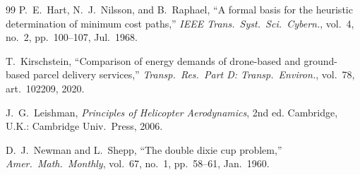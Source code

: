 \documentclass[conference]{IEEEtran}
\newcommand{\rd}[1]{#1}   %
\begin{document}
\begin{thebibliography}{99}
P.\ E.\ Hart, N.\ J.\ Nilsson, and B.\ Raphael, ``A formal basis for the heuristic
determination of minimum cost paths,'' \emph{IEEE Trans.\ Syst.\ Sci.\ Cybern.},
vol.~4, no.~2, pp.~100--107, Jul.\ 1968.

T.\ Kirschstein, ``Comparison of energy demands of drone-based and
ground-based parcel delivery services,'' \emph{Transp.\ Res.\ Part D: Transp.\
Environ.}, vol.~78, art.~102209, 2020.

\rd{J.\ G.\ Leishman, \emph{Principles of Helicopter Aerodynamics}, 2nd ed.
Cambridge, U.K.: Cambridge Univ.\ Press, 2006.}

\rd{D.\ J.\ Newman and L.\ Shepp, ``The double dixie cup problem,''
\emph{Amer.\ Math.\ Monthly}, vol.~67, no.~1, pp.~58--61, Jan.\ 1960.}

\end{thebibliography}
\end{document}
